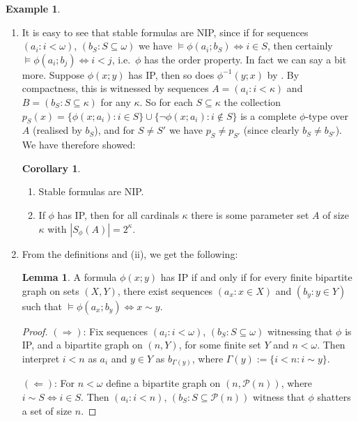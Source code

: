 \documentclass[a4paper]{report}
\newcommand{\PS}{\mathcal{P}}
\renewcommand{\implies}{\Rightarrow}
\renewcommand{\iff}{\Leftrightarrow}
\theoremstyle{definition}
\newtheorem{lem}[thm]{Lemma}
\newtheorem{cor}[thm]{Corollary}
\newtheorem{exmp}[thm]{Example}
\theoremstyle{remstyle}
\begin{document}
\begin{exmp}\label{nipformex}\
	\begin{enumerate}[itemsep=12pt]
		\item It is easy to see that stable formulas are NIP, since if for sequences $(a_i:i<\omega)$, $(b_S:S\subseteq\omega)$ we have $\models\phi(a_i;b_S)\iff i\in S$, then certainly $\models\phi(a_i;b_j)\iff i<j$, i.e.\ $\phi$ has the order property. In fact we can say a bit more. Suppose $\phi(x;y)$ has IP, then so does $\phi^{-1}(y;x)$ by . By compactness, this is witnessed by sequences $A=(a_i:i<\kappa)$ and $B=(b_S:S\subseteq\kappa)$ for any $\kappa$. So for each $S\subseteq\kappa$ the collection $p_S(x)=\{\phi(x;a_i):i\in S\}\cup\{\neg\phi(x;a_i):i\not\in S\}$ is a complete $\phi$-type over $A$ (realised by $b_S$), and for $S\neq S'$ we have $p_S\neq p_{S'}$ (since clearly $b_S\neq b_{S'}$). We have therefore showed:
		      \bigskip

		      \begin{cor}\label{stable->nip}\
			      \begin{enumerate}
				      \item Stable formulas are NIP.
				      \item If $\phi$ has IP, then for all cardinals $\kappa$ there is some parameter set $A$ of size $\kappa$ with $|S_{\phi}(A)|=2^{\kappa}$.
			      \end{enumerate}
		      \end{cor}

		\item From the definitions and  (ii), we get the following:
		      \bigskip
		      \begin{lem}
			      A formula $\phi(x;y)$ has IP if and only if for every finite bipartite graph on sets $(X,Y)$, there exist sequences $(a_x:x\in X)$ and $(b_y:y\in Y)$ such that $\models\phi(a_x;b_y)\iff x\sim y$.
		      \end{lem}
		      \bigskip

		      \begin{proof}
			      $(\implies)$: Fix sequences $(a_i:i<\omega)$, $(b_S:S\subseteq \omega)$ witnessing that $\phi$ is IP, and a bipartite graph on $(n,Y)$, for some finite set $Y$ and $n<\omega$. Then interpret $i<n$ as $a_i$ and $y\in Y$ as $b_{\Gamma(y)}$, where $\Gamma(y) :=\{i<n:i\sim y\}$.
			      \bigskip

			      $(\Leftarrow)$: For $n<\omega$ define a bipartite graph on $(n,\PS(n))$, where $i\sim S\iff i\in S$. Then $(a_i:i<n)$, $(b_S:S\subseteq \PS(n))$ witness that $\phi$ shatters a set of size $n$.
		      \end{proof}
		      \bigskip


\end{enumerate}
\end{exmp}
\end{document}
